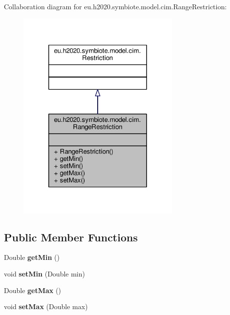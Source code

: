 Collaboration diagram for eu.\+h2020.\+symbiote.\+model.\+cim.\+Range\+Restriction\+:\nopagebreak
\begin{figure}[H]
\begin{center}
\leavevmode
\includegraphics[width=228pt]{classeu_1_1h2020_1_1symbiote_1_1model_1_1cim_1_1RangeRestriction__coll__graph}
\end{center}
\end{figure}
\subsection*{Public Member Functions}
\begin{DoxyCompactItemize}
\item 
\mbox{\label{classeu_1_1h2020_1_1symbiote_1_1model_1_1cim_1_1RangeRestriction_a6dc6668f2e20f865de8459ffbc904089}} 
Double {\bfseries get\+Min} ()
\item 
\mbox{\label{classeu_1_1h2020_1_1symbiote_1_1model_1_1cim_1_1RangeRestriction_a53bf726192aa3cc682a8cd5deb84e5b7}} 
void {\bfseries set\+Min} (Double min)
\item 
\mbox{\label{classeu_1_1h2020_1_1symbiote_1_1model_1_1cim_1_1RangeRestriction_aee5a8e8259f14eeb1e8a47eabb46002c}} 
Double {\bfseries get\+Max} ()
\item 
\mbox{\label{classeu_1_1h2020_1_1symbiote_1_1model_1_1cim_1_1RangeRestriction_a43281f59c9db80ed85487da7e708c282}} 
void {\bfseries set\+Max} (Double max)
\end{DoxyCompactItemize}


